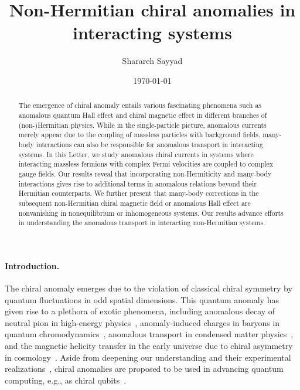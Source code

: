 \documentclass[prl,aps,showpacs,twocolumn,preprintnumbers,
amsmath,amssymb,superscriptaddress,longbibliography]{revtex4-1}
\begin{document}
% 

\title{Non-Hermitian chiral anomalies in interacting systems}
\author{Sharareh Sayyad}
%

\begin{abstract}
The emergence of chiral anomaly entails various fascinating phenomena such as anomalous quantum Hall effect and chiral magnetic effect in different branches of (non-)Hermitian physics. While in the single-particle picture, anomalous currents merely appear due to the coupling of massless particles with background fields, many-body interactions can also be responsible for anomalous transport in interacting systems. In this Letter, we study anomalous chiral currents in systems where interacting massless fermions with complex Fermi velocities are coupled to complex gauge fields. Our results reveal that incorporating non-Hermiticity and many-body interactions gives rise to additional terms in anomalous relations beyond their Hermitian counterparts. We further present that many-body corrections in the subsequent non-Hermitian chiral magnetic field or anomalous Hall effect are nonvanishing in nonequilibrium or inhomogeneous systems.  
Our results advance efforts in understanding the anomalous transport in interacting non-Hermitian systems.
%
\end{abstract}
%
\date{\today}
\maketitle

\paragraph*{ Introduction.}

The chiral anomaly emerges due to the violation of classical chiral symmetry by quantum fluctuations in odd spatial dimensions. This quantum anomaly has given rise to a plethora of exotic phenomena, including anomalous decay of neutral pion in high-energy physics~\cite{Bell1969, Adler1969, Adler1969b, Bilal2008, Zinn2019}, anomaly-induced charges in baryons in quantum chromodynamics~\cite{Eto2012}, anomalous transport in condensed matter physics~\cite{Zyuzin2012, Hosur2013, Landsteiner2016, Frohlich2018, Araki2019, Arouca2022, Frohlich2023}, and the magnetic helicity transfer in the early universe due to chiral asymmetry in cosmology~\cite{Boyarsky2012, Brandenburg2017}. Aside from deepening our understanding and their experimental realizations~\cite{Huang2015, Hirschberger2016, Zhang2016, Li2016, Ong2021}, chiral anomalies are proposed to be used in advancing quantum computing, e.g., as chiral qubits~\cite{Kharzeev2019, Babaev2023}.
\end{document}
